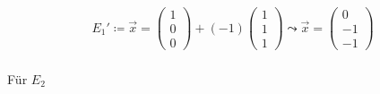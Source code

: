 \begin{gather}
E_1'\coloneqq \vec{x} = \begin{pmatrix}
1\\0\\0
\end{pmatrix}+(-1) \begin{pmatrix}
1\\1\\1
\end{pmatrix} 
\leadsto \vec{x} =
\begin{pmatrix}
0\\-1\\-1
\end{pmatrix}
\end{gather}\\

Für \ensuremath{E_2}

